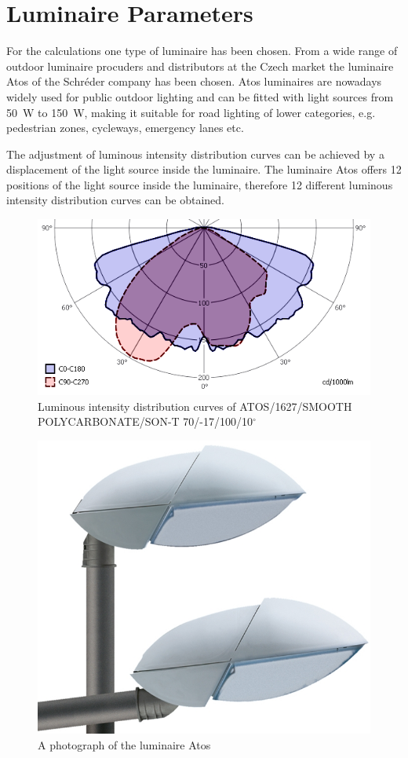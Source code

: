 \section{Luminaire Parameters}
For the calculations one type of luminaire has been chosen. From a wide range of outdoor luminaire procuders and distributors at the Czech market the luminaire Atos of the Schr\'{e}der company has been chosen. Atos luminaires are nowadays widely used for public outdoor lighting and can be fitted with light sources from 50~W to 150~W, making it suitable for road lighting of lower categories, e.g. pedestrian zones, cycleways, emergency lanes etc.

The adjustment of luminous intensity distribution curves can be achieved by a displacement of the light source inside the luminaire. The luminaire Atos offers 12 positions of the light source inside the luminaire, therefore 12 different luminous intensity distribution curves can be obtained. 

\begin{figure}[htb]
  \centering
  \includegraphics[width=\columnwidth]{70W_A1_v2}
  \caption{Luminous intensity distribution curves of ATOS/1627/SMOOTH POLYCARBONATE/SON-T 70/-17/100/10$^\circ$}
  \label{fig:lumIntDistr}
\end{figure}

\begin{figure}[htb]
  \centering
  \includegraphics[width=0.7\columnwidth]{Atos}
  \caption{A photograph of the luminaire Atos}
  \label{fig:lumIntDistr}
\end{figure}
